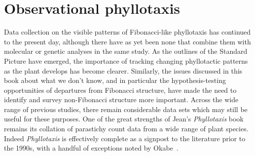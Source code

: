   \section{Observational phyllotaxis}
  Data collection on the visible patterns of Fibonacci-like phyllotaxis has continued to the present day, although there have as yet been none that combine them with molecular or genetic analyses in the same study.
  As the outlines of the Standard Picture have emerged, the importance of tracking changing phyllotactic patterns as the plant develops has become clearer. Similarly, the issues discussed in this book about what we don't know, and in particular the hypothesis-testing opportunities of departures from Fibonacci structure, have made the need to identify and survey non-Fibonacci structure more important. Across the wide range of previous studies, there remain considerable data sets which may still be useful for these purposes.  One of the great strengths of Jean's \textit{Phyllotaxis} book remains its collation of parastichy count data from a wide range of plant species. Indeed \textit{Phyllotaxis} is effectively complete as a signpost to the literature prior to the 1990s, with a handful of exceptions
  noted by Okabe~\autocite{okabeRiddlePhyllotaxisExquisite2016}.
 
